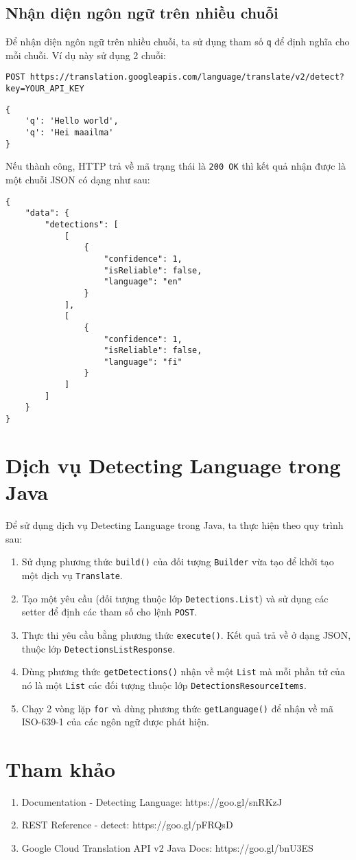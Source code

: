 \documentclass[../thesis.tex]{subfiles}
\begin{document}
\subsection{Nhận diện ngôn ngữ trên nhiều chuỗi}
Để nhận diện ngôn ngữ trên nhiều chuỗi, ta sử dụng tham số \lstinline{q} để định nghĩa cho mỗi chuỗi. Ví dụ này sử dụng 2 chuỗi:
\begin{lstlisting}[style=link]
POST https://translation.googleapis.com/language/translate/v2/detect?key=YOUR_API_KEY
\end{lstlisting}
\begin{lstlisting}[style=link]
{
	'q': 'Hello world',
	'q': 'Hei maailma'
}
\end{lstlisting}

Nếu thành công, HTTP trả về mã trạng thái là \lstinline{200 OK} thì kết quả nhận được là một chuỗi JSON có dạng như sau:

\begin{lstlisting}[style=link]
{
	"data": {
		"detections": [
			[
				{
					"confidence": 1,
					"isReliable": false,
					"language": "en"
				}
			],
			[
				{
					"confidence": 1,
					"isReliable": false,
					"language": "fi"
				}
			]
		]
	}
}
\end{lstlisting}

\section{Dịch vụ Detecting Language trong Java}
Để sử dụng dịch vụ Detecting Language trong Java, ta thực hiện theo quy trình sau:
\begin{enumerate}
  \item Sử dụng phương thức \lstinline{build()} của đối tượng \lstinline{Builder} vừa tạo để khởi tạo một dịch vụ \lstinline{Translate}.
  \item Tạo một yêu cầu (đối tượng thuộc lớp \lstinline{Detections.List}) và sử dụng các setter để định các tham số cho lệnh \lstinline{POST}.
  \item Thực thi yêu cầu bằng phương thức \lstinline{execute()}. Kết quả trả về ở dạng JSON, thuộc lớp \lstinline{DetectionsListResponse}.
  \item Dùng phương thức \lstinline{getDetections()} nhận về một \lstinline{List} mà mỗi phần tử của nó là một \lstinline{List} các đối tượng thuộc lớp \lstinline{DetectionsResourceItems}.
  \item Chạy 2 vòng lặp \lstinline{for} và dùng phương thức \lstinline{getLanguage()} để nhận về mã ISO-639-1 của các ngôn ngữ được phát hiện.
\end{enumerate}

\section*{Tham khảo}

\begin{enumerate}
  \item Documentation - Detecting Language: https://goo.gl/snRKzJ
  \item REST Reference - detect: https://goo.gl/pFRQsD
  \item Google Cloud Translation API v2 Java Docs: https://goo.gl/bnU3ES
\end{enumerate}
\end{document}
